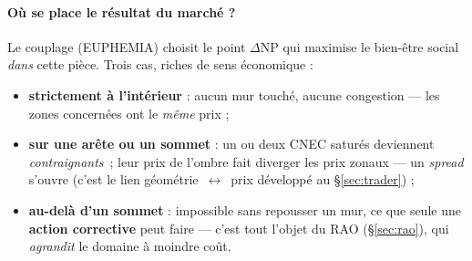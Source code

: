 \documentclass[11pt,a4paper]{article}
\begin{document}
\begin{center}
\end{center}

\paragraph{Où se place le résultat du marché ?} Le couplage (EUPHEMIA) choisit
le point $\Delta\mathrm{NP}$ qui maximise le bien-être social \emph{dans} cette
pièce. Trois cas, riches de sens économique :
\begin{itemize}[nosep,leftmargin=1.4em]
  \item \textbf{strictement à l'intérieur} : aucun mur touché, aucune
        congestion — les zones concernées ont le \emph{même} prix ;
  \item \textbf{sur une arête ou un sommet} : un ou deux CNEC saturés
        deviennent \emph{contraignants}~; leur prix de l'ombre fait diverger
        les prix zonaux — un \emph{spread} s'ouvre (c'est le lien
        géométrie~$\leftrightarrow$~prix développé au \S\ref{sec:trader}) ;
  \item \textbf{au-delà d'un sommet} : impossible sans repousser un mur, ce que
        seule une \textbf{action corrective} peut faire — c'est tout l'objet du
        RAO (\S\ref{sec:rao}), qui \emph{agrandit} le domaine à moindre coût.
\end{itemize}
\end{document}
